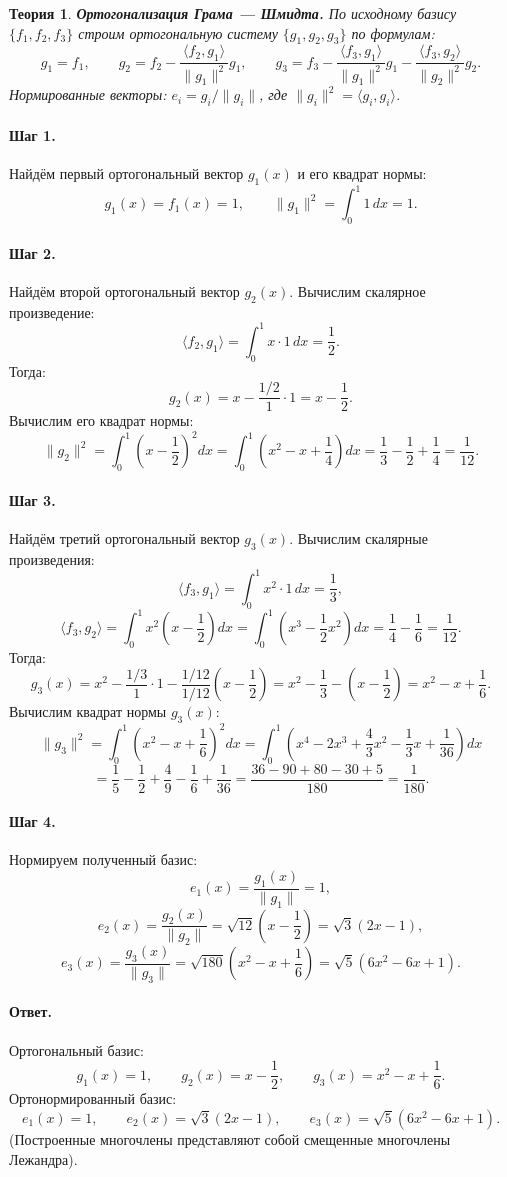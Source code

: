 \documentclass[12pt,a4paper]{article}
\theoremstyle{solution}
\newtheorem*{theory}{Теория}
\newcommand{\answer}{\paragraph{Ответ.}}
\newcommand{\step}[1]{\paragraph{Шаг #1.}}
\begin{document}
\begin{theory}
\textbf{Ортогонализация Грама — Шмидта.} По исходному базису $\{f_1, f_2, f_3\}$ строим ортогональную систему $\{g_1, g_2, g_3\}$ по формулам:
\[
g_1 = f_1, \qquad g_2 = f_2 - \frac{\langle f_2, g_1\rangle}{\|g_1\|^2}g_1, \qquad g_3 = f_3 - \frac{\langle f_3, g_1\rangle}{\|g_1\|^2}g_1 - \frac{\langle f_3, g_2\rangle}{\|g_2\|^2}g_2.
\]
Нормированные векторы: $e_i = g_i / \|g_i\|$, где $\|g_i\|^2 = \langle g_i, g_i\rangle$.
\end{theory}

\step{1} Найдём первый ортогональный вектор $g_1(x)$ и его квадрат нормы:
\[
g_1(x) = f_1(x) = 1, \qquad \|g_1\|^2 = \int_0^1 1\,dx = 1.
\]

\step{2} Найдём второй ортогональный вектор $g_2(x)$. Вычислим скалярное произведение:
\[
\langle f_2, g_1\rangle = \int_0^1 x \cdot 1\,dx = \frac{1}{2}.
\]
Тогда:
\[
g_2(x) = x - \frac{1/2}{1} \cdot 1 = x - \frac{1}{2}.
\]
Вычислим его квадрат нормы:
\[
\|g_2\|^2 = \int_0^1 \left(x - \frac{1}{2}\right)^2 dx = \int_0^1 \left(x^2 - x + \frac{1}{4}\right) dx = \frac{1}{3} - \frac{1}{2} + \frac{1}{4} = \frac{1}{12}.
\]

\step{3} Найдём третий ортогональный вектор $g_3(x)$. Вычислим скалярные произведения:
\[
\langle f_3, g_1\rangle = \int_0^1 x^2 \cdot 1\,dx = \frac{1}{3},
\]
\[
\langle f_3, g_2\rangle = \int_0^1 x^2 \left(x - \frac{1}{2}\right) dx = \int_0^1 \left(x^3 - \frac{1}{2}x^2\right) dx = \frac{1}{4} - \frac{1}{6} = \frac{1}{12}.
\]
Тогда:
\[
g_3(x) = x^2 - \frac{1/3}{1} \cdot 1 - \frac{1/12}{1/12} \left(x - \frac{1}{2}\right) = x^2 - \frac{1}{3} - \left(x - \frac{1}{2}\right) = x^2 - x + \frac{1}{6}.
\]
Вычислим квадрат нормы $g_3(x)$:
\[
\|g_3\|^2 = \int_0^1 \left(x^2 - x + \frac{1}{6}\right)^2 dx = \int_0^1 \left(x^4 - 2x^3 + \frac{4}{3}x^2 - \frac{1}{3}x + \frac{1}{36}\right) dx
\]
\[
= \frac{1}{5} - \frac{1}{2} + \frac{4}{9} - \frac{1}{6} + \frac{1}{36} = \frac{36 - 90 + 80 - 30 + 5}{180} = \frac{1}{180}.
\]

\step{4} Нормируем полученный базис:
\[
e_1(x) = \frac{g_1(x)}{\|g_1\|} = 1,
\]
\[
e_2(x) = \frac{g_2(x)}{\|g_2\|} = \sqrt{12}\left(x - \frac{1}{2}\right) = \sqrt{3}(2x - 1),
\]
\[
e_3(x) = \frac{g_3(x)}{\|g_3\|} = \sqrt{180}\left(x^2 - x + \frac{1}{6}\right) = \sqrt{5}(6x^2 - 6x + 1).
\]

\answer
Ортогональный базис:
\[
g_1(x) = 1, \qquad g_2(x) = x - \frac{1}{2}, \qquad g_3(x) = x^2 - x + \frac{1}{6}.
\]
Ортонормированный базис:
\[
e_1(x) = 1, \qquad e_2(x) = \sqrt{3}(2x - 1), \qquad e_3(x) = \sqrt{5}(6x^2 - 6x + 1).
\]
(Построенные многочлены представляют собой смещенные многочлены Лежандра).
\end{document}
